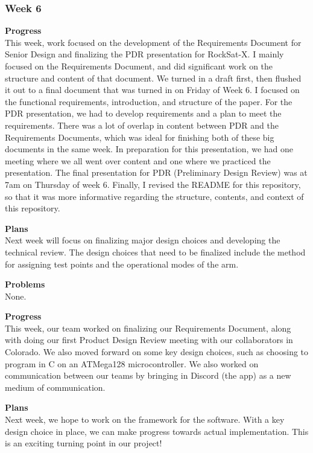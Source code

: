 \subsubsection{Week 6}
\textbf{Progress} \\
This week, work focused on the development of the Requirements Document for Senior Design and finalizing the PDR presentation for RockSat-X. I mainly focused on the Requirements Document, and did significant work on the structure and content of that document. We turned in a draft first, then flushed it out to a final document that was turned in on Friday of Week 6. I focused on the functional requirements, introduction, and structure of the paper. For the PDR presentation, we had to develop requirements and a plan to meet the requirements. There was a lot of overlap in content between PDR and the Requirements Documents, which was ideal for finishing both of these big documents in the same week. In preparation for this presentation, we had one meeting where we all went over content and one where we practiced the presentation. The final presentation for PDR (Preliminary Design Review) was at 7am on Thursday of week 6. Finally, I revised the README for this repository, so that it was more informative regarding the structure, contents, and context of this repository.

\textbf{Plans} \\
Next week will focus on finalizing major design choices and developing the technical review. The design choices that need to be finalized include the method for assigning test points and the operational modes of the arm.

\textbf{Problems} \\
None.

\textbf{Progress} \\
This week, our team worked on finalizing our Requirements Document, along with doing our first Product Design Review 
meeting with our collaborators in Colorado. We also moved forward on some key design choices, such as choosing to 
program in C on an ATMega128 microcontroller. We also worked on communication between our teams by bringing in Discord 
(the app) as a new medium of communication.

\textbf{Plans} \\
Next week, we hope to work on the framework for the software. With a key design choice in place, we can make progress
towards actual implementation. This is an exciting turning point in our project!

